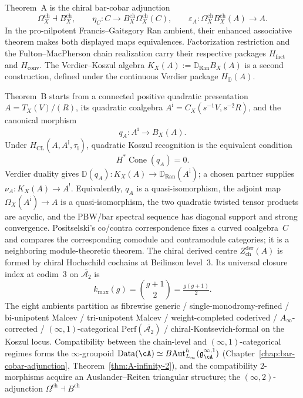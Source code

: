 Theorem~A is the chiral bar-cobar adjunction
\[
\Omega^{\mathrm{ch}}_X \dashv B^{\mathrm{ch}}_X,
\qquad
\eta_C\colon C\to B^{\mathrm{ch}}_X\Omega^{\mathrm{ch}}_X(C),
\qquad
\varepsilon_A\colon
\Omega^{\mathrm{ch}}_X B^{\mathrm{ch}}_X(A)\to A .
\]
In the pro-nilpotent Francis--Gaitsgory Ran ambient, their enhanced
associative theorem makes both displayed maps equivalences.  Factorization
restriction and the Fulton--MacPherson chain realization carry their
respective packages $H_{\mathrm{fact}}$ and $H_{\mathrm{conv}}$.  The
Verdier--Koszul algebra
$K_X(A):=\mathbb D_{\operatorname{Ran}}B_X(A)$ is a second
construction, defined under the continuous Verdier package
$H_{\mathbb D}(A)$.

Theorem~B starts from a connected positive quadratic presentation
$A=T_X(V)/(R)$, its quadratic coalgebra
$A^{\mathrm i}=C_X(s^{-1}V,s^{-2}R)$, and the canonical morphism
\[
q_A\colon A^{\mathrm i}\longrightarrow B_X(A).
\]
Under $H_{\mathrm{CL}}(A,A^{\mathrm i},\tau_{\mathrm i})$, quadratic
Koszul recognition is the equivalent condition
\[
H^*\!\operatorname{Cone}(q_A)=0.
\]
Verdier duality gives
$\mathbb D(q_A)\colon K_X(A)\to
\mathbb D_{\operatorname{Ran}}(A^{\mathrm i})$; a chosen partner
supplies $\nu_A\colon K_X(A)\to A^!$.
Equivalently, $q_A$ is a quasi-isomorphism, the adjoint map
$\Omega_X(A^{\mathrm i})\to A$ is a quasi-isomorphism, the two
quadratic twisted tensor products are acyclic, and the PBW/bar
spectral sequence has diagonal support and strong convergence.
Positselski's co/contra correspondence fixes a curved coalgebra~$C$
and compares the corresponding comodule and contramodule categories;
it is a neighboring module-theoretic theorem.  The chiral derived
centre $Z^{\mathrm{der}}_{\mathrm{ch}}(A)$ is formed by chiral
Hochschild cochains at Beilinson level~3.  Its universal closure index at
codim~$3$ on $\overline{\mathcal A_2}$ is
\[
k_{\max}(g) = \binom{g+1}{2} = \tfrac{g(g+1)}{2}.
\]
The eight ambients partition as fibrewise generic /
single-monodromy-refined / bi-unipotent Malcev / tri-unipotent Malcev /
weight-completed coderived / $A_\infty$-corrected /
$(\infty,1)$-categorical $\mathrm{Perf}(\overline{\mathcal A_2})$ /
chiral-Kontsevich-formal on the Koszul locus. Compatibility between the
chain-level and $(\infty,1)$-categorical regimes forms the
$\infty$-groupoid
$\mathrm{Data}(\cA) \simeq B\mathrm{Aut}^h_{L_\infty}(\mathfrak g^{\infty,1}_{\cA})$
(Chapter~\ref{chap:bar-cobar-adjunction},
Theorem~\ref{thm:A-infinity-2}), and the compatibility
$2$-morphisms acquire an Auslander--Reiten triangular structure; the
$(\infty,2)$-adjunction $\Omega^{\mathrm{ch}} \dashv B^{\mathrm{ch}}$
